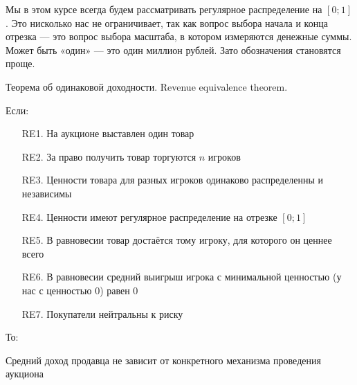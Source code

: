 Мы в этом курсе всегда будем рассматривать регулярное распределение на $ [0;1] $. Это нисколько нас не ограничивает, так как вопрос выбора начала и конца отрезка — это вопрос выбора масштаба, в котором измеряются денежные суммы. Может быть «один» — это один миллион рублей. Зато обозначения становятся проще.


\begin{myth} Теорема об одинаковой доходности. Revenue equivalence theorem. 


Если:

\begin{itemize}
\item[RE1.] На аукционе выставлен один товар
\item[RE2.] За право получить товар торгуются $ n $ игроков
\item[RE3.] Ценности товара для разных игроков одинаково распределенны и независимы
\item[RE4.] Ценности имеют регулярное распределение на отрезке $ [0;1] $
\item[RE5.] В равновесии товар достаётся тому игроку, для которого он ценнее всего
\item[RE6.] В равновесии средний выигрыш игрока с минимальной ценностью (у нас с ценностью 0) равен 0
\item[RE7.] Покупатели нейтральны к риску
\end{itemize}

То:

Средний доход продавца не зависит от конкретного механизма проведения аукциона

\end{myth}



